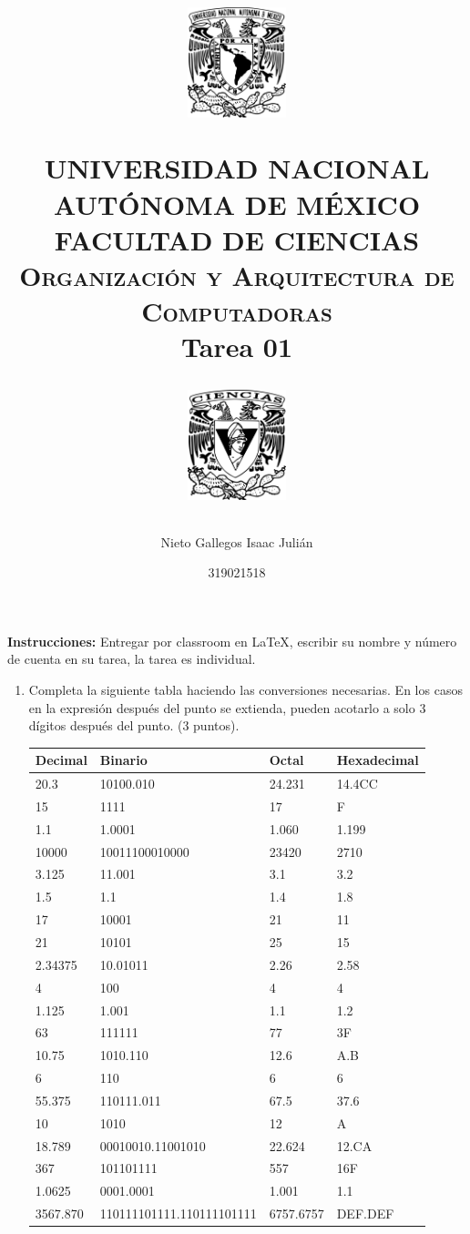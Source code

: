 \documentclass[12pt,letterpaper]{article}
\title{
		\vspace{-0.7in} 	
		\usefont{OT1}{bch}{b}{n}
		\begin{minipage}{3cm}
        \vspace{-0.5in} 	
    	\begin{center}
    		\includegraphics[height=3.2cm]{../logo_unam.png}
    	\end{center}
    \end{minipage}\hfill
    \begin{minipage}{10.7cm}
    
    	\begin{center}
\normalfont \normalsize \textsc{UNIVERSIDAD NACIONAL AUTÓNOMA DE MÉXICO \\ FACULTAD DE CIENCIAS \\ Organización y Arquitectura de Computadoras } \\
		\huge Tarea 01
    	\end{center}
     
    \end{minipage}\hfill
    \begin{minipage}{3.2cm}
    \vspace{-0.5in} 
    	\begin{center}
    		\includegraphics[height=3.2cm]{../logo_fc.png}
    	\end{center}
    \end{minipage}

\author{Nieto Gallegos Isaac Julián}
\date{319021518}
}
\begin{document}
\maketitle

\textbf{Instrucciones:} Entregar por classroom en \LaTeX, escribir su nombre y número de cuenta en su tarea, la tarea es individual.\\

\begin{enumerate}
    \item Completa la siguiente tabla haciendo las conversiones necesarias. En los casos en la expresión después del punto se extienda, pueden acotarlo a solo 3 dígitos después del punto. (3 puntos).

    \begin{table}[H]
    \centering
    \begin{tabular}{|l|l|l|l|}
    \hline
    Decimal & Binario  & Octal & Hexadecimal \\ \hline
    20.3    & 10100.010& 24.231& 14.4CC      \\ \hline
    15      & 1111     & 17    & F           \\ \hline
    1.1     & 1.0001   & 1.060 & 1.199       \\ \hline
    10000   & 10011100010000& 23420 & 2710   \\ \hline
    3.125   & 11.001   & 3.1   & 3.2         \\ \hline
    1.5     & 1.1      & 1.4   & 1.8         \\ \hline
    17      & 10001    & 21    & 11          \\ \hline
    21      & 10101    & 25    & 15          \\ \hline
    2.34375 & 10.01011 & 2.26  & 2.58        \\ \hline
    4       & 100      & 4     & 4           \\ \hline
    1.125   & 1.001    & 1.1   & 1.2         \\ \hline
    63      & 111111   & 77    & 3F          \\ \hline
    10.75   & 1010.110 & 12.6  & A.B         \\ \hline
    6       & 110      & 6     & 6           \\ \hline
    55.375  & 110111.011 & 67.5& 37.6        \\ \hline
    10      & 1010     & 12    & A           \\ \hline
    18.789  & 00010010.11001010& 22.624& 12.CA \\ \hline
    367     & 101101111& 557   & 16F         \\ \hline
    1.0625  & 0001.0001& 1.001 & 1.1         \\ \hline
    3567.870& 110111101111.110111101111& 6757.6757& DEF.DEF     \\ \hline
    \end{tabular}
    \end{table}


\end{enumerate}
\end{document}

